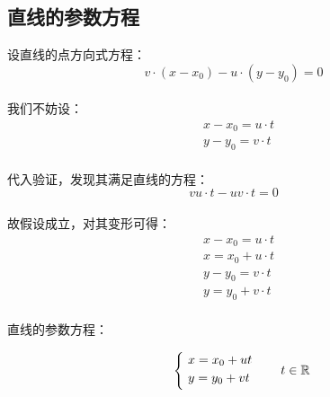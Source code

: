 \documentclass[UTF8]{ctexart}
\begin{document}
\subsection{直线的参数方程}
    设直线的点方向式方程：
    \setcounter{equation}{0}
    \begin{equation}
        v\cdot(x-x_0)-u\cdot(y-y_0)=0
    \end{equation}\\
    我们不妨设：
    \begin{align}
        &x-x_0=u\cdot t\\[3mm]
        &y-y_0=v\cdot t
    \end{align}\\
    代入验证，发现其满足直线的方程：
    \begin{equation}
        vu\cdot t-uv\cdot t=0
    \end{equation}\\
    故假设成立，对其变形可得：
    \begin{align}
        &x-x_0=u\cdot t\\[3mm]
        &x=x_0+u\cdot t\\[5mm]
        &y-y_0=v\cdot t\\[3mm]
        &y=y_0+v\cdot t
    \end{align}\\
    直线的参数方程：\\[1mm]
    \begin{large}
        \begin{equation*}
            ~~~~\begin{cases}
                ~x=x_0+ut\\
                ~y=y_0+vt\vspace{3pt}
            \end{cases}\quad t\in \mathbb{R}
        \end{equation*}
    \end{large}\\

\newpage
\end{document}
